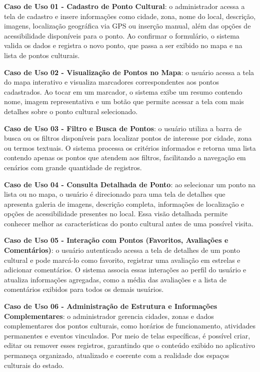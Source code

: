 \begin{lista}
  \item \textbf{Caso de Uso 01 - Cadastro de Ponto Cultural}: o administrador acessa a tela de cadastro e insere informações como cidade, zona, nome do local, descrição, imagens, localização geográfica via GPS ou inserção manual, além das opções de acessibilidade disponíveis para o ponto. Ao confirmar o formulário, o sistema valida os dados e registra o novo ponto, que passa a ser exibido no mapa e na lista de pontos culturais.
  
  \item \textbf{Caso de Uso 02 - Visualização de Pontos no Mapa}: o usuário acessa a tela do mapa interativo e visualiza marcadores correspondentes aos pontos cadastrados. Ao tocar em um marcador, o sistema exibe um resumo contendo nome, imagem representativa e um botão que permite acessar a tela com mais detalhes sobre o ponto cultural selecionado.
  
  \item \textbf{Caso de Uso 03 - Filtro e Busca de Pontos}: o usuário utiliza a barra de busca ou os filtros disponíveis para localizar pontos de interesse por cidade, zona ou termos textuais. O sistema processa os critérios informados e retorna uma lista contendo apenas os pontos que atendem aos filtros, facilitando a navegação em cenários com grande quantidade de registros.
  
  \item \textbf{Caso de Uso 04 - Consulta Detalhada de Ponto}: ao selecionar um ponto na lista ou no mapa, o usuário é direcionado para uma tela de detalhes que apresenta galeria de imagens, descrição completa, informações de localização e opções de acessibilidade presentes no local. Essa visão detalhada permite conhecer melhor as características do ponto cultural antes de uma possível visita.
  
  \item \textbf{Caso de Uso 05 - Interação com Pontos (Favoritos, Avaliações e Comentários)}: o usuário autenticado acessa a tela de detalhes de um ponto cultural e pode marcá-lo como favorito, registrar uma avaliação em estrelas e adicionar comentários. O sistema associa essas interações ao perfil do usuário e atualiza informações agregadas, como a média das avaliações e a lista de comentários exibidos para todos os demais usuários.
  
  \item \textbf{Caso de Uso 06 - Administração de Estrutura e Informações Complementares}: o administrador gerencia cidades, zonas e dados complementares dos pontos culturais, como horários de funcionamento, atividades permanentes e eventos vinculados. Por meio de telas específicas, é possível criar, editar ou remover esses registros, garantindo que o conteúdo exibido no aplicativo permaneça organizado, atualizado e coerente com a realidade dos espaços culturais do estado.
\end{lista}


